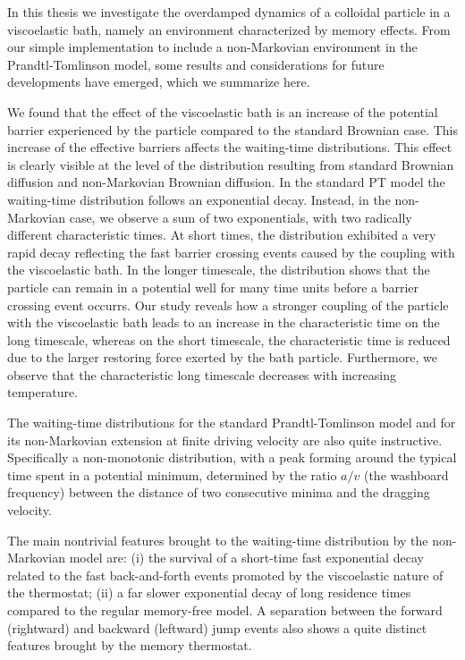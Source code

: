 In this thesis we investigate the overdamped dynamics of a colloidal particle in a viscoelastic bath, namely an environment characterized by memory
effects. From our simple implementation to include a non-Markovian environment in the Prandtl-Tomlinson model, some results and considerations for future developments have emerged, which we summarize here. 

We found that the effect of the viscoelastic bath is an increase of the potential barrier experienced by the particle compared to the standard Brownian case.
This increase of the effective barriers affects the waiting-time distributions. This effect is clearly visible at the level of the distribution resulting from standard Brownian diffusion and non-Markovian Brownian diffusion. In the standard PT model the waiting-time distribution follows an exponential decay. Instead, in the non-Markovian case, we observe a sum of two exponentials, with two radically different characteristic times. At short times, the distribution exhibited a very rapid decay reflecting the fast barrier crossing events caused by the coupling with the viscoelastic bath. In the longer timescale, the distribution shows that the particle can remain in a potential well for many time units before a barrier crossing event occurrs. Our study reveals how a stronger coupling of the particle with the viscoelastic bath leads to an increase in the characteristic time on the long timescale, whereas on the short timescale, the characteristic time is reduced due to the larger restoring force exerted by the bath particle. Furthermore, we observe that the characteristic long timescale decreases with increasing temperature. 

The waiting-time distributions for the standard Prandtl-Tomlinson model and for its non-Markovian extension at finite driving velocity are also quite instructive. Specifically a non-monotonic distribution, with a peak forming around the typical time spent in a potential minimum, determined by the ratio $a/v$ (the washboard frequency) between the distance of two consecutive minima and the dragging velocity.

The main nontrivial features brought to the waiting-time distribution by the non-Markovian model are: (i) the survival of a short-time fast exponential decay related to the fast back-and-forth events promoted by the viscoelastic nature of the thermostat; (ii) a far slower exponential decay of long residence times compared to the regular memory-free model. A separation between the forward (rightward) and backward (leftward) jump events also shows a quite distinct features brought by the memory thermostat.

